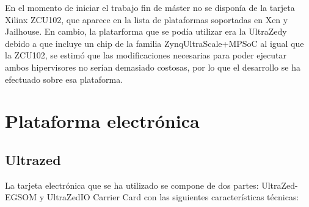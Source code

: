 En el momento de iniciar el trabajo fin de máster no se disponía de la tarjeta Xilinx ZCU102, que aparece en la lista de plataformas soportadas en Xen y Jailhouse. En cambio, la platarforma que se podía utilizar era la UltraZed\texttrademark y debido a que incluye un chip de la familia Zynq\textregistered UltraScale+\texttrademark MPSoC al igual que la ZCU102, se estimó que las modificaciones necesarias para poder ejecutar ambos hipervisores no serían demasiado costosas, por lo que el desarrollo se ha efectuado sobre esa plataforma.

\section{Plataforma electrónica}
\subsection{Ultrazed\texttrademark}
La tarjeta electrónica que se ha utilizado se compone de dos partes: UltraZed-EG\texttrademark \acrshort{SOM} y UltraZed\texttrademark IO Carrier Card con las siguientes características técnicas:
